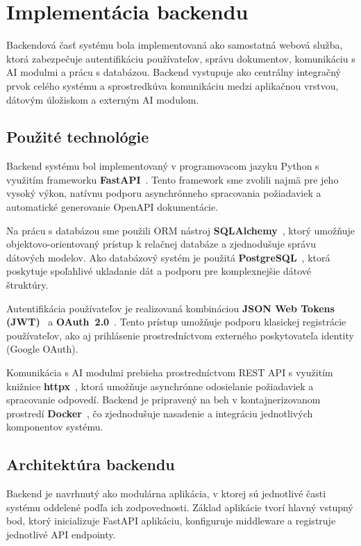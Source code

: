 \section{Implementácia backendu}

Backendová časť systému bola implementovaná ako samostatná webová služba,
ktorá zabezpečuje autentifikáciu používateľov, správu dokumentov, komunikáciu
s AI modulmi a prácu s databázou. Backend vystupuje ako centrálny integračný
prvok celého systému a sprostredkúva komunikáciu medzi aplikačnou vrstvou,
dátovým úložiskom a externým AI modulom.

\subsection{Použité technológie}

Backend systému bol implementovaný v programovacom jazyku Python s využitím
frameworku \textbf{FastAPI}~\cite{fastapi}. Tento framework sme zvolili najmä
pre jeho vysoký výkon, natívnu podporu asynchrónneho spracovania požiadaviek a
automatické generovanie OpenAPI dokumentácie.

Na prácu s databázou sme použili ORM nástroj \textbf{SQLAlchemy}~\cite{sqlalchemy},
ktorý umožňuje objektovo-orientovaný prístup k relačnej databáze a zjednodušuje
správu dátových modelov. Ako databázový systém je použitá
\textbf{PostgreSQL}~\cite{postgresql}, ktorá poskytuje spoľahlivé ukladanie dát
a podporu pre komplexnejšie dátové štruktúry.

Autentifikácia používateľov je realizovaná kombináciou
\textbf{JSON Web Tokens (JWT)}~\cite{jwt} a \textbf{OAuth~2.0}~\cite{oauth2}.
Tento prístup umožňuje podporu klasickej registrácie používateľov, ako aj
prihlásenie prostredníctvom externého poskytovateľa identity
(Google OAuth).

Komunikácia s AI modulmi prebieha prostredníctvom REST API s využitím knižnice
\textbf{httpx}~\cite{httpx}, ktorá umožňuje asynchrónne odosielanie požiadaviek
a spracovanie odpovedí. Backend je pripravený na beh v kontajnerizovanom
prostredí \textbf{Docker}~\cite{docker}, čo zjednodušuje nasadenie a integráciu
jednotlivých komponentov systému.

\subsection{Architektúra backendu}

Backend je navrhnutý ako modulárna aplikácia, v ktorej sú jednotlivé časti
systému oddelené podľa ich zodpovednosti. Základ aplikácie tvorí hlavný
vstupný bod, ktorý inicializuje FastAPI aplikáciu, konfiguruje middleware
a registruje jednotlivé API endpointy.

